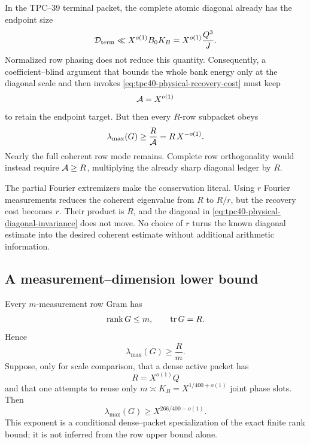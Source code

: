 In the TPC--39 terminal packet, the complete atomic diagonal already has
the endpoint size
\begin{equation}
 \mathcal D_{\rm term}
 \ll X^{o(1)}B_0K_B
 =X^{o(1)}\frac{Q^3}{J}.
 \label{eq:tpc40-physical-diagonal-target}
\end{equation}
Normalized row phasing does not reduce this quantity.  Consequently, a
coefficient--blind argument that bounds the whole bank energy only at the
diagonal scale and then invokes
\eqref{eq:tpc40-physical-recovery-cost} must keep
\begin{equation}
 \mathcal A=X^{o(1)}
 \label{eq:tpc40-physical-subpolynomial-A}
\end{equation}
to retain the endpoint target.  But then every \(R\)-row subpacket obeys
\begin{equation}
 \lambda_{\max}(G)
 \ge\frac{R}{\mathcal A}=R\,X^{-o(1)}.
 \label{eq:tpc40-physical-residual-coherence}
\end{equation}
Nearly the full coherent row mode remains.  Complete row orthogonality
would instead require \(\mathcal A\ge R\), multiplying the already sharp
diagonal ledger by \(R\).

The partial Fourier extremizers make the conservation literal.  Using
\(r\) Fourier measurements reduces the coherent eigenvalue from \(R\) to
\(R/r\), but the recovery cost becomes \(r\).  Their product is \(R\),
and the diagonal in \eqref{eq:tpc40-physical-diagonal-invariance} does not
move.  No choice of \(r\) turns the known diagonal estimate into the
desired coherent estimate without additional arithmetic information.

\subsection{A measurement--dimension lower bound}

Every \(m\)-measurement row Gram has
\begin{equation}
 \operatorname{rank} G\le m,
 \qquad
 \operatorname{tr} G=R.
 \label{eq:tpc40-physical-rank-trace}
\end{equation}
Hence
\begin{equation}
 \lambda_{\max}(G)\ge\frac Rm.
 \label{eq:tpc40-physical-dimension-bound}
\end{equation}
Suppose, only for scale comparison, that a dense active packet has
\begin{equation}
 R=X^{o(1)}Q
 \label{eq:tpc40-physical-dense-packet}
\end{equation}
and that one attempts to reuse only
\(m\asymp K_B=X^{1/400+o(1)}\) joint phase slots.  Then
\begin{equation}
 \lambda_{\max}(G)
 \ge X^{266/400-o(1)}.
 \label{eq:tpc40-physical-266-bound}
\end{equation}
This exponent is a conditional dense--packet specialization of the exact
finite rank bound; it is not inferred from the row upper bound alone.

